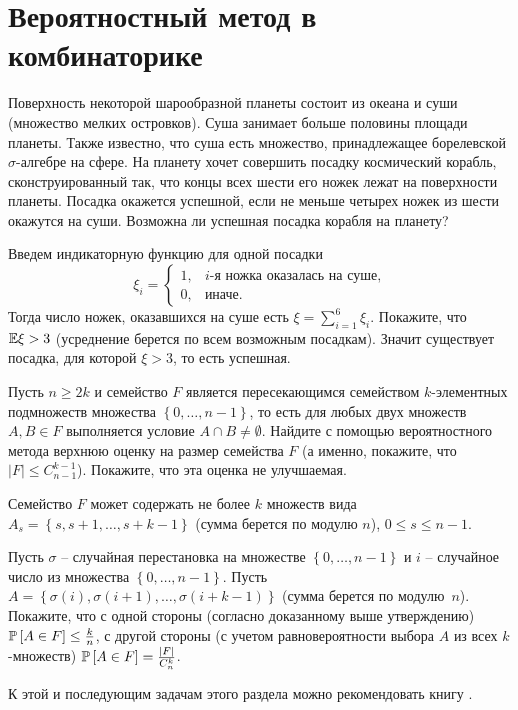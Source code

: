 \section{Вероятностный метод в комбинаторике}
\label{combinatorics}

\begin{problem}
Поверхность некоторой шарообразной планеты состоит из океана и суши (множество мелких островков). Суша занимает больше половины 
площади планеты. Также известно, что суша есть множество, принадлежащее борелевской  $\sigma$-алгебре на сфере. На планету хочет 
совершить посадку космический корабль, сконструированный так, что концы всех шести его ножек лежат на поверхности планеты. 
Посадка окажется успешной, если не меньше четырех ножек из шести окажутся на суши. Возможна ли успешная посадка корабля на планету?
\end{problem}

\begin{ordre}
Введем индикаторную функцию для одной посадки
\[ \xi_i = 
\begin{cases}
1, & i\text{-я ножка оказалась на суше,}\\
0, & \text{иначе.}
\end{cases}
\]
Тогда число ножек, оказавшихся на суше есть $\xi = \sum \limits_{i=1}^6 \xi_i$.
Покажите, что   $ \mathrm{{\mathbb E}} \xi > 3$ (усреднение берется по всем возможным посадкам). Значит существует посадка, для которой   $\xi  > 3$, то есть успешная.
\end{ordre}

\begin{problem} 
Пусть $n\ge 2k$ и семейство $F$ является пересекающимся семейством $k$-элементных подмножеств множества $\left\{0,\ldots ,n-1\right\}$, то есть для любых двух множеств $A,B\in F$ выполняется условие $A\cap B\ne \emptyset $. Найдите с помощью вероятностного метода верхнюю оценку на размер семейства $F$ (а именно, покажите, что $|F|\le C_{n-1}^{k-1} $). Покажите, что эта оценка не улучшаемая.
\end{problem}

\begin{ordre} 
Семейство $F$ может содержать не более $k$ множеств вида $A_{s} =\left\{s,s+1,\ldots ,s+k-1\right\}$ (сумма берется по модулю $n$), $0\le s\le n-1$.


Пусть $\sigma $ -- случайная перестановка на множестве $\left\{0,\ldots ,n-1\right\}$ и $i$ -- случайное число из множества $\left\{0,\ldots ,n-1\right\}$. Пусть $A=\left\{\sigma (i),\sigma (i+1),\ldots ,\sigma (i+k-1)\right\}$ (сумма берется по модулю~$n$). Покажите, что с одной стороны (согласно доказанному выше утверждению) $\mathrm{{\mathbb P}}\left[A\in F\right]\le \frac{k}{n} $, с другой стороны (с учетом равновероятности выбора $A$ из всех $k$-множеств) $\mathrm{{\mathbb P}}\left[A\in F\right]=\frac{|F|}{C_{n}^{k} } $.


\end{ordre} 
\begin{remark}
К этой и последующим задачам этого раздела можно рекомендовать книгу \cite{15}.
\end{remark}



